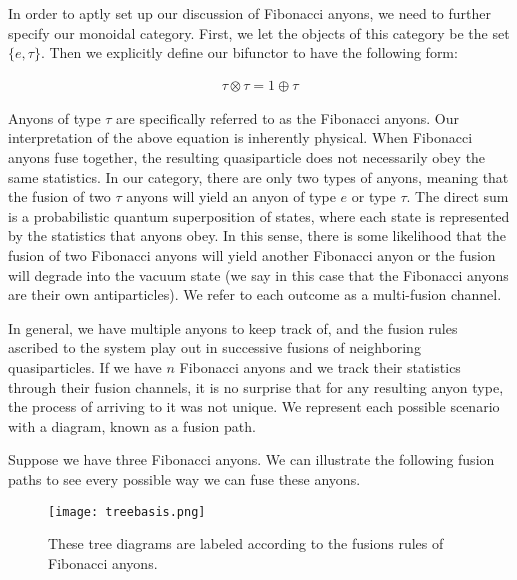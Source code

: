 In order to aptly set up our discussion of Fibonacci anyons, we need to further specify our monoidal category. First, we let the objects of this category be the set $\{e,\tau\}$. Then we explicitly define our bifunctor to have the following form:

\begin{equation}
	\begin{aligned}
		\tau \otimes \tau = 1\oplus \tau
	\end{aligned}
\end{equation}

Anyons of type $\tau$ are specifically referred to as the Fibonacci anyons. Our interpretation of the above equation is inherently physical. When Fibonacci anyons fuse together, the resulting quasiparticle does not necessarily obey the same statistics. In our category, there are only two types of anyons, meaning that the fusion of two $\tau$ anyons will yield an anyon of type $e$ or type $\tau$. The direct sum is a probabilistic quantum superposition of states, where each state is represented by the statistics that anyons obey. In this sense, there is some likelihood that the fusion of two Fibonacci anyons will yield another Fibonacci anyon or the fusion will degrade into the vacuum state (we say in this case that the Fibonacci anyons are their own antiparticles). We refer to each outcome as a multi-fusion channel.

In general, we have multiple anyons to keep track of, and the fusion rules ascribed to the system play out in successive fusions of neighboring quasiparticles. If we have $n$ Fibonacci anyons and we track their statistics through their fusion channels, it is no surprise that for any resulting anyon type, the process of arriving to it was not unique. We represent each possible scenario with a diagram, known as a fusion path.

\begin{example}\end{example} 
Suppose we have three Fibonacci anyons. We can illustrate the following fusion paths to see every possible way we can fuse these anyons.

\begin{figure}[H]
	\centering
	\texttt{[image: treebasis.png]}
	\caption{These tree diagrams are labeled according to the fusions rules of Fibonacci anyons.}
\end{figure}



